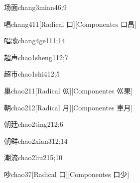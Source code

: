 \begin{verbete}{场面}{chang3mian4}{6;9}
\end{verbete}

\begin{verbete}{唱}{chang4}{11}[Radical ⼝][Componentes ⼝昌]
\end{verbete}

\begin{verbete}{唱歌}{chang4ge1}{11;14}
\end{verbete}

\begin{verbete}{超声}{chao1sheng1}{12;7}
\end{verbete}

\begin{verbete}{超市}{chao1shi4}{12;5}
\end{verbete}

\begin{verbete}{巢}{chao2}{11}[Radical ⼮][Componentes ⼮果]
\end{verbete}

\begin{verbete}{朝}{chao2}{12}[Radical ⽉][Componentes ⾞⽉]
\end{verbete}

\begin{verbete}{朝廷}{chao2ting2}{12;6}
\end{verbete}

\begin{verbete}{朝鲜}{chao2xian3}{12;14}
\end{verbete}

\begin{verbete}{潮流}{chao2liu2}{15;10}
\end{verbete}

\begin{verbete}{吵}{chao3}{7}[Radical ⼝][Componentes ⼝少]
\end{verbete}


